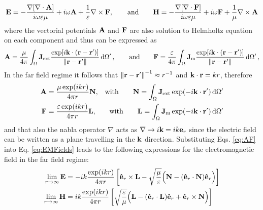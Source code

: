 %
\begin{align}
    \vb{E} = - \frac{\nabla[\nabla\cdot\vb{A}]}{i\omega\varepsilon\mu} + i \omega\vb{A} + \frac{1}{\varepsilon}\nabla\times\vb{F},
    \qquad
    \text{and}
    \qquad
    \vb{H} =- \frac{\nabla[\nabla\cdot\vb{F}]}{i\omega\varepsilon\mu} + i \omega\vb{F} + \frac{1}{\mu}\nabla\times\vb{A}
    \label{eq:EMFields}
\end{align}
%
where the vectorial potentials $\vb{A}$ and $\vb{F}$ are also solution to Helmholtz equation on each component and thus can be expressed as
%
\begin{align}
    \vb{A} = \frac{\mu}{4\pi} \int_\Omega \vb{J}_\text{ext}  \frac{\exp[i\vb{k}\cdot(\vb{r}-\vb{r}')]}{\norm{\vb{r}-\vb{r}'}}\dd{\Omega'},
    \qquad
    \text{and}
    \qquad
    \vb{F} = \frac{\varepsilon}{4\pi} \int_\Omega \vb{J}_\text{m}  \frac{\exp[i\vb{k}\cdot(\vb{r}-\vb{r}')]}{\norm{\vb{r}-\vb{r}'}}\dd{\Omega'},
\end{align}
%
In the far field regime it follows that $\norm{\vb{r}-\vb{r}'}^{-1}\approx r^{-1}$ and $\vb{k}\cdot \vb{r} = kr$, therefore
%
\begin{subequations}
    \label{eq:AF}
\begin{align}
    \vb{A} &= \frac{\mu\exp(ikr)}{4\pi r}\vb{N},         &\text{with} \qquad \vb{N} = \int_\Omega \vb{J}_\text{ext}  \exp(-i\vb{k}\cdot\vb{r}')\dd{\Omega'}\\
    \vb{F} &= \frac{\varepsilon\exp(ikr)}{4\pi r}\vb{L}, &\text{with} \qquad \vb{L}= \int_\Omega \vb{J}_\text{m}  \exp(-i\vb{k}\cdot\vb{r}')\dd{\Omega'}
\end{align}
\end{subequations}
%
and that also the nabla operator $\nabla$ acts as $\nabla\to i\vb{k} = ik\vb{e}_r$ since the electric field can be written as a plane travelling in the $\vb{k}$ direction. Substituting Eqs. \eqref{eq:AF} into Eq. \eqref{eq:EMFields} leads to the following expressions for the electromagnetic field in the far field regime:
%
\begin{subequations}
    \label{eq:EHFar}
\begin{align}
    \lim_{r\to\infty}\vb{E} &= -i k\frac{\exp(ikr)}{4\pi r}
                \left[ \vu{e}_r\times\vb{L}-\sqrt{\frac{\mu}{\varepsilon}}  \Big(\vb{N}-(\vu{e}_r\cdot\vb{N})\vu{e}_r\Big) \right]
            \label{eq:EFar}\\
    \lim_{r\to\infty}\vb{H} &=i k\frac{\exp(ikr)}{4\pi r}
                \left[\sqrt{\frac{\varepsilon}{\mu}}  \Big(\vb{L}-(\vu{e}_r\cdot\vb{L})\vu{e}_r + \vu{e}_r\times\vb{N}\Big) \right]
             \label{eq:HFar}
\end{align}
\end{subequations}
